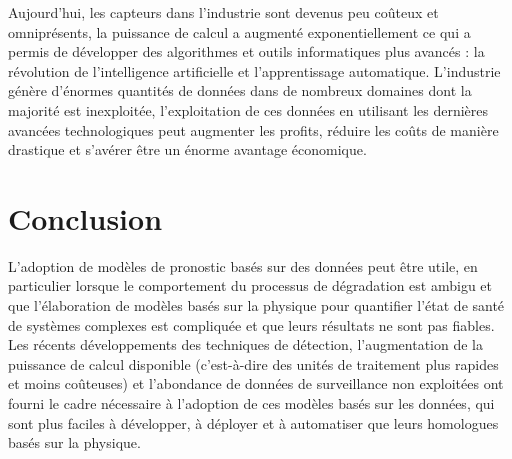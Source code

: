 Aujourd'hui, les capteurs dans l'industrie sont devenus peu coûteux et omniprésents, la puissance de calcul a augmenté exponentiellement ce qui a permis de développer des algorithmes et outils informatiques plus avancés : la révolution de l'intelligence artificielle et l'apprentissage automatique. L’industrie génère d’énormes quantités de données dans de nombreux domaines dont la majorité est inexploitée, l’exploitation de ces données en utilisant les dernières avancées technologiques peut augmenter les profits, réduire les coûts de manière drastique et s’avérer être un énorme avantage économique.

\section{Conclusion}
L'adoption de modèles de pronostic basés sur des données peut être utile, en particulier lorsque le comportement du processus de dégradation est ambigu et que l'élaboration de modèles basés sur la physique pour quantifier l'état de santé de systèmes complexes est compliquée et que leurs résultats ne sont pas fiables. Les récents développements des techniques de détection, l'augmentation de la puissance de calcul disponible (c'est-à-dire des unités de traitement plus rapides et moins coûteuses) et l'abondance de données de surveillance non exploitées ont fourni le cadre nécessaire à l'adoption de ces modèles basés sur les données, qui sont plus faciles à développer, à déployer et à automatiser que leurs homologues basés sur la physique.
